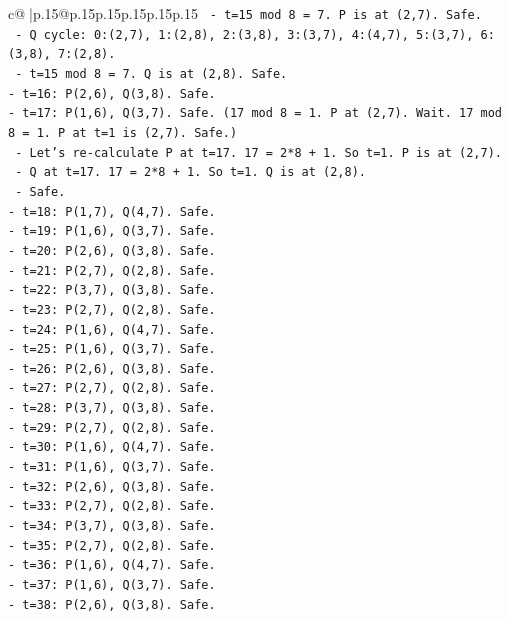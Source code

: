 \documentclass{article}
\begin{document}
{\begin{supertabular}{c@{$\;$}|p{.15\linewidth}@{}p{.15\linewidth}p{.15\linewidth}p{.15\linewidth}p{.15\linewidth}p{.15\linewidth}}
{{{\texttt{  {-} t=15 mod 8 = 7. P is at (2,7). Safe.} \\
\texttt{  {-} Q cycle: 0:(2,7), 1:(2,8), 2:(3,8), 3:(3,7), 4:(4,7), 5:(3,7), 6:(3,8), 7:(2,8).} \\
\texttt{  {-} t=15 mod 8 = 7. Q is at (2,8). Safe.} \\
\texttt{{-} t=16: P(2,6), Q(3,8). Safe.} \\
\texttt{{-} t=17: P(1,6), Q(3,7). Safe. (17 mod 8 = 1. P at (2,7). Wait. 17 mod 8 = 1. P at t=1 is (2,7). Safe.)} \\
\texttt{  {-} Let's re{-}calculate P at t=17. 17 = 2*8 + 1. So t=1. P is at (2,7).} \\
\texttt{  {-} Q at t=17. 17 = 2*8 + 1. So t=1. Q is at (2,8).} \\
\texttt{  {-} Safe.} \\
\texttt{{-} t=18: P(1,7), Q(4,7). Safe.} \\
\texttt{{-} t=19: P(1,6), Q(3,7). Safe.} \\
\texttt{{-} t=20: P(2,6), Q(3,8). Safe.} \\
\texttt{{-} t=21: P(2,7), Q(2,8). Safe.} \\
\texttt{{-} t=22: P(3,7), Q(3,8). Safe.} \\
\texttt{{-} t=23: P(2,7), Q(2,8). Safe.} \\
\texttt{{-} t=24: P(1,6), Q(4,7). Safe.} \\
\texttt{{-} t=25: P(1,6), Q(3,7). Safe.} \\
\texttt{{-} t=26: P(2,6), Q(3,8). Safe.} \\
\texttt{{-} t=27: P(2,7), Q(2,8). Safe.} \\
\texttt{{-} t=28: P(3,7), Q(3,8). Safe.} \\
\texttt{{-} t=29: P(2,7), Q(2,8). Safe.} \\
\texttt{{-} t=30: P(1,6), Q(4,7). Safe.} \\
\texttt{{-} t=31: P(1,6), Q(3,7). Safe.} \\
\texttt{{-} t=32: P(2,6), Q(3,8). Safe.} \\
\texttt{{-} t=33: P(2,7), Q(2,8). Safe.} \\
\texttt{{-} t=34: P(3,7), Q(3,8). Safe.} \\
\texttt{{-} t=35: P(2,7), Q(2,8). Safe.} \\
\texttt{{-} t=36: P(1,6), Q(4,7). Safe.} \\
\texttt{{-} t=37: P(1,6), Q(3,7). Safe.} \\
\texttt{{-} t=38: P(2,6), Q(3,8). Safe.} \\
}}}
\end{supertabular}}
\end{document}
